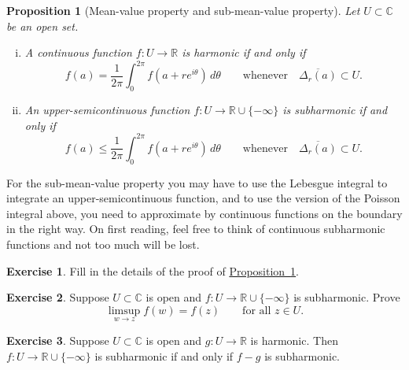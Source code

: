 \documentclass[12pt,openany]{book}
\newcommand{\C}{{\mathbb{C}}}
\newcommand{\R}{{\mathbb{R}}}
\theoremstyle{plain}
\newtheorem{prop}[thm]{Proposition}
\theoremstyle{remark}
\theoremstyle{definition}
\newenvironment{exbox}{%
    \def\FrameCommand{\vrule width 1pt \relax\hspace{10pt}}%
    \MakeFramed{\advance\hsize-\width\FrameRestore}%
}{%
    \endMakeFramed
}
\theoremstyle{exercise}
\newtheorem{exercise}{Exercise}[section]
\theoremstyle{example}
\newcommand{\propref}[1]{\hyperref[#1]{Proposition~\ref*{#1}}}
\begin{document}
\begin{prop}[Mean-value property and sub-mean-value property]
\pagebreak[2]%
\label{prop:meansubmeanprop}%
%
%
Let $U \subset \C$ be an open set.
\begin{enumerate}[(i)]
\item
A continuous function
$f \colon U \to \R$
is harmonic if and only if
\begin{equation*}
f(a) = \frac{1}{2\pi} \int_0^{2\pi} f(a+re^{i\theta})\, d\theta
\qquad \text{whenever} \quad
\overline{\Delta_r(a)} \subset U .
\end{equation*}
\item
An upper-semicontinuous function $f \colon U \to \R \cup \{ -\infty \}$
is subharmonic if and only if
\begin{equation*}
f(a) \leq \frac{1}{2\pi} \int_0^{2\pi} f(a+re^{i\theta})\, d\theta
\qquad \text{whenever} \quad
\overline{\Delta_r(a)} \subset U .
\end{equation*}
\end{enumerate}
\end{prop}

For the sub-mean-value property you may have to use
the Lebesgue integral to integrate an upper-semicontinuous function,
and to use the version of the Poisson integral above, you need to
approximate by continuous functions on the boundary in the right way.
On first reading, feel free to think of continuous subharmonic
functions and not too much will be lost.

\begin{exbox}
\begin{exercise}
Fill in the details of the proof of \propref{prop:meansubmeanprop}.
\end{exercise}

\begin{exercise}
Suppose $U \subset \C$ is open and
$f \colon U \to \R \cup\{- \infty \}$ is subharmonic.  Prove
\begin{equation*}
\limsup_{w \to z} f(w) = f(z)
\qquad \text{for all $z \in U$.}
\end{equation*}
\end{exercise}

\begin{exercise} \label{exercise:fminusgsubharmonic}
Suppose $U \subset \C$ is open and $g \colon U \to \R$ is harmonic.
Then $f \colon U \to \R \cup \{ -\infty \}$ is subharmonic if and only if $f-g$
is subharmonic.
\end{exercise}
\end{exbox}
\end{document}
